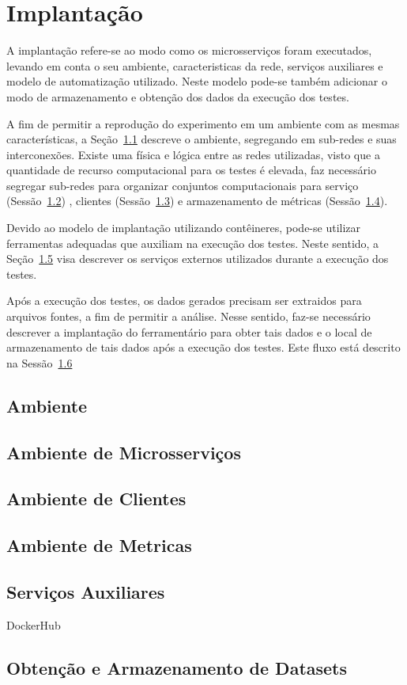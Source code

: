 \chapter{Implantação}
\label{cap6}

A implantação refere-se ao modo como os microsserviços foram executados, levando em conta o seu ambiente, caracteristicas da rede, serviços auxiliares e modelo de automatização utilizado.
%
Neste modelo pode-se também adicionar o modo de armazenamento e obtenção dos dados da execução dos testes.

A fim de permitir a reprodução do experimento em um ambiente com as mesmas características, a Seção~\ref{sec:ambiente} descreve o ambiente, segregando em sub-redes e suas interconexões.
%
Existe uma física e lógica entre as redes utilizadas, visto que a quantidade de recurso computacional para os testes é elevada, faz necessário segregar sub-redes para organizar conjuntos computacionais para serviço (Sessão~\ref{sec:ambiente_mic}) , clientes (Sessão~\ref{sec:ambiente_cli}) e armazenamento de métricas (Sessão~\ref{sec:ambiente_met}).

Devido ao modelo de implantação utilizando contêineres, pode-se utilizar ferramentas adequadas que auxiliam na execução dos testes.
%
Neste sentido, a Seção~\ref{sec:servicos_aux} visa descrever os serviços externos utilizados durante a execução dos testes.

Após a execução dos testes, os dados gerados precisam ser extraidos para arquivos fontes, a fim de permitir a análise.
%
Nesse sentido, faz-se necessário descrever a implantação do ferramentário para obter tais dados e o local de armazenamento de tais dados após a execução dos testes.
%
Este fluxo está descrito na Sessão~\ref{sec:datasets}

\section{Ambiente}
\label{sec:ambiente}

\section{Ambiente de Microsserviços}
\label{sec:ambiente_mic}

\section{Ambiente de Clientes}
\label{sec:ambiente_cli}

\section{Ambiente de Metricas}
\label{sec:ambiente_met}

\section{Serviços Auxiliares}
\label{sec:servicos_aux}
DockerHub

\section{Obtenção e Armazenamento de Datasets}
\label{sec:datasets}
